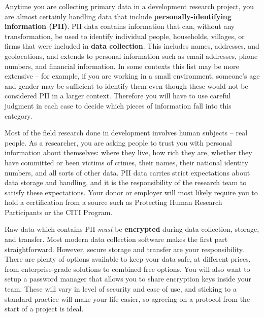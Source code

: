 Anytime you are collecting primary data in a development research project,
you are almost certainly handling data that include \textbf{personally-identifying information (PII)}.
PII data contains information that can, without any transformation, be used to identify
individual people, households, villages, or firms that were included in \textbf{data collection}.
This includes names, addresses, and geolocations, and extends to personal information
such as email addresses, phone numbers, and financial information.
In some contexts this list may be more extensive --
for example, if you are working in a small environment,
someone's age and gender may be sufficient to identify them
even though these would not be considered PII in a larger context.
Therefore you will have to use careful judgment in each case
to decide which pieces of information fall into this category.

Most of the field research done in development involves human subjects -- real people.
As a researcher, you are asking people to trust you with personal information about themselves:
where they live, how rich they are, whether they have committed or been victims of crimes,
their names, their national identity numbers, and all sorts of other data.
PII data carries strict expectations about data storage and handling,
and it is the responsibility of the research team to satisfy these expectations.
Your donor or employer will most likely require you to hold a certification from a source
such as Protecting Human Research Participants
or the CITI Program.

Raw data which contains PII \textit{must} be \textbf{encrypted}
during data collection, storage, and transfer.
Most modern data collection software makes the first part straightforward.
However, secure storage and transfer are your responsibility.
There are plenty of options available to keep your data safe,
at different prices, from enterprise-grade solutions to combined free options.
You will also want to setup a password manager that allows you to share encryption keys inside your team.
These will vary in level of security and ease of use,
and sticking to a standard practice will make your life easier,
so agreeing on a protocol from the start of a project is ideal.

